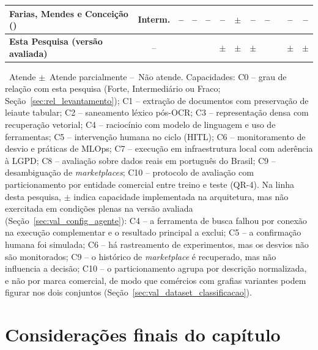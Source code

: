 \begin{quadro}[htb]
{\begin{tabular}{|l|c|*{10}{c|}}
	\hline
	Farias, Mendes e Conceição (\citeyear{farias2025notaconforme}) & Interm. & -- & -- & -- & -- & $\pm$ & -- & -- & \checkmark & -- & -- \\
	\hline
	\textbf{Esta Pesquisa (versão avaliada)} & -- & \checkmark & \checkmark & \checkmark & $\pm$ & $\pm$ & $\pm$ & \checkmark & \checkmark & $\pm$ & $\pm$ \\
	\hline
\end{tabular}%
}
\begin{flushleft}
	\footnotesize \checkmark\ Atende \quad $\pm$\ Atende parcialmente \quad --\ Não atende. Capacidades: C0 -- grau de relação com esta pesquisa (Forte, Intermediário ou Fraco; Seção~\ref{sec:rel_levantamento}); C1 -- extração de documentos com preservação de leiaute tabular; C2 -- saneamento léxico pós-OCR; C3 -- representação densa com recuperação vetorial; C4 -- raciocínio com modelo de linguagem e uso de ferramentas; C5 -- intervenção humana no ciclo (HITL); C6 -- monitoramento de desvio e práticas de MLOps; C7 -- execução em infraestrutura local com aderência à LGPD; C8 -- avaliação sobre dados reais em português do Brasil; C9 -- desambiguação de \textit{marketplaces}; C10 -- protocolo de avaliação com particionamento por entidade comercial entre treino e teste (QR-4). Na linha desta pesquisa, $\pm$ indica capacidade implementada na arquitetura, mas não exercitada em condições plenas na versão avaliada (Seção~\ref{sec:val_config_agente}): C4 -- a ferramenta de busca falhou por conexão na execução complementar e o resultado principal a exclui; C5 -- a confirmação humana foi simulada; C6 -- há rastreamento de experimentos, mas os desvios não são monitorados; C9 -- o histórico de \textit{marketplace} é recuperado, mas não influencia a decisão; C10 -- o particionamento agrupa por descrição normalizada, e não por marca comercial, de modo que comércios com grafias variantes podem figurar nos dois conjuntos (Seção~\ref{sec:val_dataset_classificacao}).
\end{flushleft}
\end{quadro}

\section{Considerações finais do capítulo}
\label{sec:rel_conclusao}

